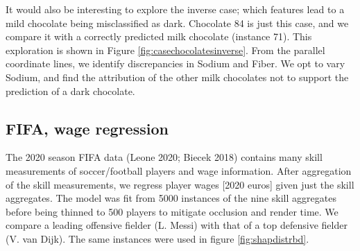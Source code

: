 \documentclass[
]{article}
\begin{document}
It would also be interesting to explore the inverse case; which features lead to a mild chocolate being misclassified as dark. Chocolate 84 is just this case, and we compare it with a correctly predicted milk chocolate (instance 71). This exploration is shown in Figure \ref{fig:casechocolatesinverse}. From the parallel coordinate lines, we identify discrepancies in Sodium and Fiber. We opt to vary Sodium, and find the attribution of the other milk chocolates not to support the prediction of a dark chocolate.

\hypertarget{fifa-wage-regression}{%
\subsection{FIFA, wage regression}\label{fifa-wage-regression}}

The 2020 season FIFA data (Leone 2020; Biecek 2018) contains many skill measurements of soccer/football players and wage information. After aggregation of the skill measurements, we regress player wages {[}2020 euros{]} given just the skill aggregates. The model was fit from 5000 instances of the nine skill aggregates before being thinned to 500 players to mitigate occlusion and render time. We compare a leading offensive fielder (L. Messi) with that of a top defensive fielder (V. van Dijk). The same instances were used in figure \ref{fig:shapdistrbd}.
\end{document}
